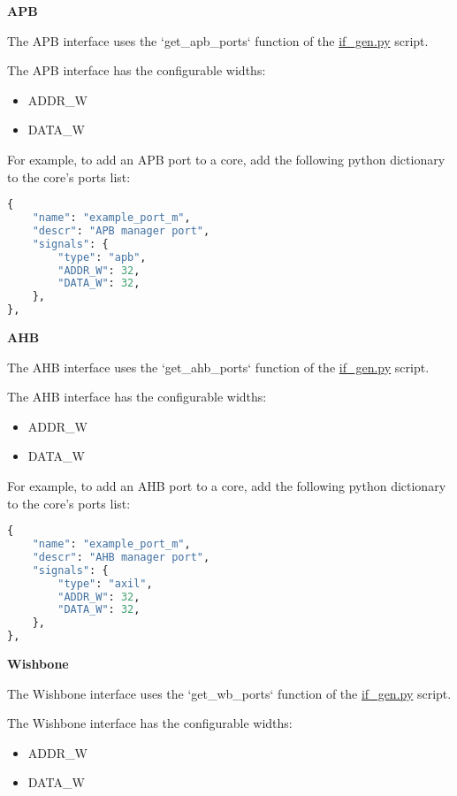 %
%
\clearpage
\large\textbf{APB}

The APB interface uses the `get\_apb\_ports` function of the \href{https://github.com/IObundle/py2hwsw/blob/main/py2hwsw/scripts/if_gen.py}{if\_gen.py} script.


The APB interface has the configurable widths:
\begin{itemize}
  \item ADDR\_W
  \item DATA\_W
\end{itemize}

For example, to add an APB port to a core, add the following python dictionary to the core's ports list:
\begin{lstlisting}[language=python]
{
	"name": "example_port_m",
	"descr": "APB manager port",
	"signals": {
		"type": "apb",
		"ADDR_W": 32,
		"DATA_W": 32,
	},
},
\end{lstlisting}


%
%
\clearpage
\large\textbf{AHB}

The AHB interface uses the `get\_ahb\_ports` function of the \href{https://github.com/IObundle/py2hwsw/blob/main/py2hwsw/scripts/if_gen.py}{if\_gen.py} script.


The AHB interface has the configurable widths:
\begin{itemize}
  \item ADDR\_W
  \item DATA\_W
\end{itemize}

For example, to add an AHB port to a core, add the following python dictionary to the core's ports list:
\begin{lstlisting}[language=python]
{
	"name": "example_port_m",
	"descr": "AHB manager port",
	"signals": {
		"type": "axil",
		"ADDR_W": 32,
		"DATA_W": 32,
	},
},
\end{lstlisting}


%
%
\clearpage
\large\textbf{Wishbone}

The Wishbone interface uses the `get\_wb\_ports` function of the \href{https://github.com/IObundle/py2hwsw/blob/main/py2hwsw/scripts/if_gen.py}{if\_gen.py} script.


The Wishbone interface has the configurable widths:
\begin{itemize}
  \item ADDR\_W
  \item DATA\_W
\end{itemize}

